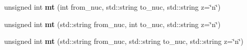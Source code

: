 \begin{Indent}
\begin{DoxyCompactItemize}
\mbox{\label{namespacepyne_1_1rxname_ae60365d15decfc47d1a5347c51539044}} 
unsigned int {\bfseries mt} (int from\+\_\+nuc, std\+::string to\+\_\+nuc, std\+::string z=\char`\"{}n\char`\"{})
\item 
\mbox{\label{namespacepyne_1_1rxname_a0ec75a7a63fd4fd12fc532e6709d15ce}} 
unsigned int {\bfseries mt} (std\+::string from\+\_\+nuc, int to\+\_\+nuc, std\+::string z=\char`\"{}n\char`\"{})
\item 
\mbox{\label{namespacepyne_1_1rxname_af154ac0682fcad310e2ce7dd91174438}} 
unsigned int {\bfseries mt} (std\+::string from\+\_\+nuc, std\+::string to\+\_\+nuc, std\+::string z=\char`\"{}n\char`\"{})
\end{DoxyCompactItemize}
\end{Indent}
